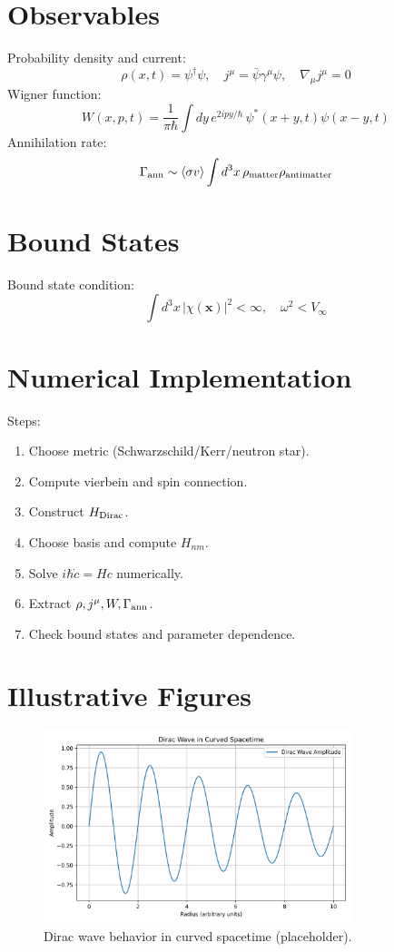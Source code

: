 \documentclass[12pt,a4paper]{article}
\begin{document}
\section{Observables}
Probability density and current:
\[
\rho(x,t)=\psi^\dagger\psi,\quad j^\mu = \bar\psi \gamma^\mu \psi, \quad \nabla_\mu j^\mu = 0
\]
Wigner function:
\[
W(x,p,t)=\frac{1}{\pi\hbar}\int dy\, e^{2 i p y/\hbar}\,\psi^*(x+y,t)\psi(x-y,t)
\]
Annihilation rate:
\[
\Gamma_{\rm ann} \sim \langle\sigma v\rangle \int d^3x\,\rho_{\rm matter}\rho_{\rm antimatter}
\]

\section{Bound States}
Bound state condition:
\[
\int d^3x\,|\chi(\mathbf{x})|^2 < \infty,\quad \omega^2 < V_\infty
\]

\section{Numerical Implementation}
Steps:
\begin{enumerate}
\item Choose metric (Schwarzschild/Kerr/neutron star).  
\item Compute vierbein and spin connection.  
\item Construct \(H_{\rm Dirac}\).  
\item Choose basis and compute \(H_{nm}\).  
\item Solve \(i\hbar \dot c = Hc\) numerically.  
\item Extract \(\rho, j^\mu, W, \Gamma_{\rm ann}\).  
\item Check bound states and parameter dependence.
\end{enumerate}

\section{Illustrative Figures}
\begin{figure}[H]
\centering
\includegraphics[width=0.8\textwidth]{dirac_curved.png}
\caption{Dirac wave behavior in curved spacetime (placeholder).}
\label{fig:dirac}
\end{figure}
\end{document}

